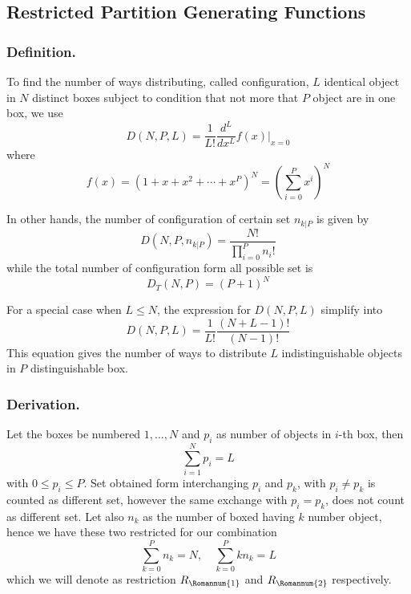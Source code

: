 \documentclass[../../main.tex]{subfiles}
\begin{document}
\subsection{Restricted Partition Generating Functions}
\subsubsection{Definition.} To find the number of ways distributing, called configuration, $L$ identical object in $N$ distinct boxes subject to condition that not more that $P$ object are in one box, we use 
\begin{equation*}
    D(N,P,L)=\frac{1}{L!}\frac{d^L}{dx^L}f(x)\bigg|_{x=0}
\end{equation*}
where
\begin{equation*}
    f(x)=\left(1+x+x^2+\cdots+ x^P\right)^N=\left(\sum^{P }_{i=0}x^i\right)^N
\end{equation*}

In other hands, the number of configuration of certain set $n_{k|P}$ is given by 
\begin{equation*}
    D(N,P,n_{k|P})=\frac{N!}{\displaystyle\prod_{i=0}^{P}n_i!}
\end{equation*}
while the total number of configuration form all possible set is 
\begin{equation*}
    D_T(N,P)=(P+1)^N
\end{equation*}

For a special case when $L\leq N$, the expression for $D(N,P,L)$ simplify into 
\begin{equation*}
    D(N,P,L)=\frac{1}{L!}\frac{(N+L-1)!}{(N-1)!}
\end{equation*}
This equation gives the number of ways to distribute $L$ indistinguishable objects in $P$ distinguishable box.

\subsubsection{Derivation.} Let the boxes be numbered $1,\dots, N$ and $p_i$ as number of objects in $i$-th box, then 
\begin{equation*}
    \sum_{i=1}^{N}p_i=L
\end{equation*}
with $0\leq p_i\leq P$. Set obtained form interchanging $p_i$ and $p_k$, with $p_i\neq p_k$ is counted as different set, however the same exchange with $p_i=p_k$, does not count as different set. Let also $n_k$ as the number of boxed having $k$ number object, hence we have these two restricted for our combination
\begin{equation*}
    \sum_{k=0}^{P}n_k=N,\quad\sum_{k=0 }^{P }kn_k=L
\end{equation*}
which we will denote as restriction $R_\Romannum{1}$ and $R_\Romannum{2}$ respectively.
\end{document}
